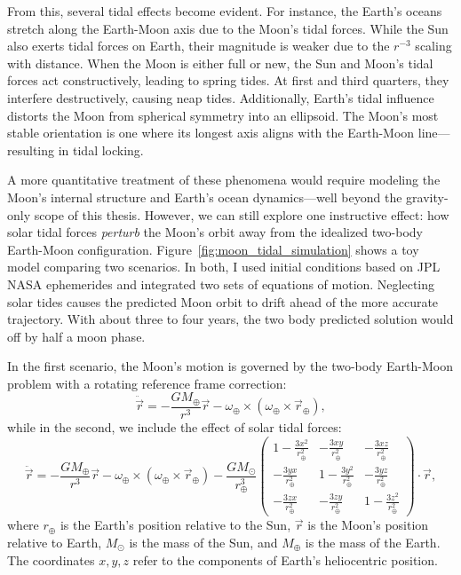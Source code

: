             From this, several tidal effects become evident. For instance, the Earth's oceans stretch along the Earth-Moon axis due to the Moon's tidal forces. While the Sun also exerts tidal forces on Earth, their magnitude is weaker due to the $r^{-3}$ scaling with distance. When the Moon is either full or new, the Sun and Moon's tidal forces act constructively, leading to spring tides. At first and third quarters, they interfere destructively, causing neap tides. Additionally, Earth's tidal influence distorts the Moon from spherical symmetry into an ellipsoid. The Moon's most stable orientation is one where its longest axis aligns with the Earth-Moon line—resulting in tidal locking.

            A more quantitative treatment of these phenomena would require modeling the Moon's internal structure and Earth's ocean dynamics—well beyond the gravity-only scope of this thesis. However, we can still explore one instructive effect: how solar tidal forces \textit{perturb} the Moon's orbit away from the idealized two-body Earth-Moon configuration. Figure~\ref{fig:moon_tidal_simulation} shows a toy model comparing two scenarios. In both, I used initial conditions based on JPL NASA ephemerides \citep{2014IPNPR.196C...1F} and integrated two sets of equations of motion. Neglecting solar tides causes the predicted Moon orbit to drift ahead of the more accurate trajectory. With about three to four years, the two body predicted solution would off by half a moon phase. 

            In the first scenario, the Moon's motion is governed by the two-body Earth-Moon problem with a rotating reference frame correction:
            \begin{equation}
                \ddot{\vec{r}} = -\frac{GM_\oplus}{r^3}\vec{r} - \omega_\oplus \times \left(\omega_\oplus \times \vec{r}_\oplus\right),
            \end{equation}
            while in the second, we include the effect of solar tidal forces:
            \begin{equation}
                \ddot{\vec{r}} = -\frac{GM_\oplus}{r^3}\vec{r} - \omega_\oplus \times \left(\omega_\oplus \times \vec{r}_\oplus\right) -\frac{GM_\odot}{r_\oplus^3}
                \left(\begin{matrix}
                    1-\frac{3x^2}{r_\oplus^2} & -\frac{3xy}{r_\oplus^2} & -\frac{3xz}{r_\oplus^2} \\
                    -\frac{3yx}{r_\oplus^2} & 1-\frac{3y^2}{r_\oplus^2} & -\frac{3yz}{r_\oplus^2} \\
                    -\frac{3zx}{r_\oplus^2} & -\frac{3zy}{r_\oplus^2} & 1-\frac{3z^2}{r_\oplus^2}
                \end{matrix}  \right) \cdot \vec{r},
            \end{equation}
            where $r_\oplus$ is the Earth's position relative to the Sun, $\vec{r}$ is the Moon's position relative to Earth, $M_\odot$ is the mass of the Sun, and $M_\oplus$ is the mass of the Earth. The coordinates $x, y, z$ refer to the components of Earth's heliocentric position.

